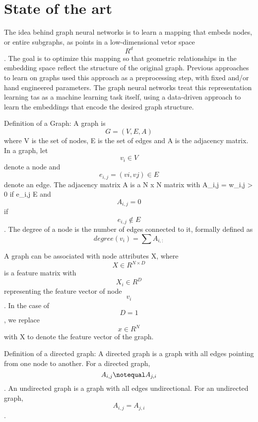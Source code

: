 \section{State of the art}




The idea behind graph neural networks is to learn a mapping that embeds nodes, or entire subgraphs, as points in a low-dimensional vetor space $$R^d$$. The goal is to optimize this mapping so that geometric relationships in the embedding space reflect the structure of the original graph. Previous approaches to learn on graphs used this approach as a preprocessing step, with fixed and/or hand engineered parameters. The graph neural networks treat this representation learning tas as a machine learning task itself, using a data-driven approach to learn the embeddings that encode the desired graph structure.


Definition of a Graph: A graph is $$G = (V,E,A)$$ where V is the set of nodes, E is the set of edges and A is the adjacency matrix. In a graph, let $$ v_{i} \in V $$ denote a node and $$ e_{i,j} = (vi, vj) \in E $$ denote an edge. The adjacency matrix A is a N x N matrix with A_{i,j} = w_{i,j} > 0 if e_{i,j} \in E and $$ A_{i,j}=0$$ if $$e_{i,j} \notin E$$. The degree of a node is the number of edges connected to it, formally defined as $$ degree(v_i) = \sum A_{i,:}$$

A graph can be associated with node attributes X, where $$X \in R^{N \times D}$$ is a feature matrix with $$X_i \in R^{D}$$ representing the feature vector of node $$v_i$$. In the case of $$D = 1$$, we replace $$x \in R^N$$ with X to denote the feature vector of the graph.

Definition of a directed graph: A directed graph is a graph with all edges pointing from one node to another. For a directed graph, $$A_{i,j} \notequal A_{j,i}$$. An undirected graph is a graph with all edges undirectional. For an undirected graph, $$A_{i,j} = A_{j,i}$$.







